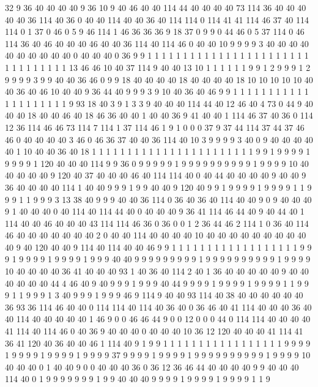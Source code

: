 32 9 36 40 40 40 40 9 36 10 9 40 46 40 40 114 44 40 40 40
40 73 114 36 40 40 40 40 40 36 114 40 36 0 40 40 114 40 40 36
40 114 114 0 114 41 41 114 46 37 40 114 114 0 1 37 0 46 0 5
9 46 114 1 46 36 36 36 9 18 37 0 9 9 0 44 46 0 5 37
114 0 46 114 36 40 46 40 40 40 46 40 40 36 114 40 114 46 0 40
40 10 9 9 9 9 3 40 40 40 40 40 40 40 40 40 40 0 40 40
40 0 36 9 9 1 1 1 1 1 1 1 1 1 1 1 1 1 1 1
1 1 1 1 1 1 1 1 1 1 1 1 1 1 1 1 1 13 46 46
10 40 37 114 9 40 40 13 10 1 1 1 1 1 1 9 9 1 2 9
9 9 1 2 9 9 9 9 3 9 9 40 40 36 46 0 9 9 18 40
40 40 40 18 40 40 40 40 18 10 10 10 10 10 40 40 36 40 46 10
40 40 9 36 44 40 9 9 9 3 9 10 40 36 40 46 9 9 1 1
1 1 1 1 1 1 1 1 1 1 1 1 1 1 1 1 1 1 9 93
18 40 3 9 1 3 3 9 40 40 40 114 44 40 12 46 40 4 73 0
44 9 40 40 40 18 40 40 46 40 18 46 36 40 40 1 40 40 36 9
41 40 40 1 114 46 37 40 36 0 114 12 36 114 46 46 73 114 7 114
1 37 114 46 1 9 1 0 0 0 37 9 37 44 114 37 44 37 46 46
0 40 40 40 40 3 46 0 46 36 37 40 40 36 114 40 10 3 9 9
9 9 3 40 0 9 40 40 40 40 40 1 10 40 40 36 40 18 1 1
1 1 1 1 1 1 1 1 1 1 1 1 1 1 1 1 1 1 1 1
1 9 9 1 9 9 9 9 1 9 9 9 9 1 120 40 40 40 114 9
9 36 0 9 9 9 9 9 1 9 9 9 9 9 9 9 9 9 9 1
9 9 9 9 10 40 40 40 40 40 9 120 40 37 40 40 40 46 40 114
114 40 0 40 44 40 40 40 40 9 40 40 9 36 40 40 40 40 114 1
40 40 9 9 9 1 9 9 40 40 9 120 40 9 9 1 9 9 9 9
1 9 9 9 9 1 1 9 9 9 1 1 9 9 9 3 13 38 40 9
9 9 40 40 36 114 0 36 40 36 40 114 40 40 9 0 9 40 40 40
9 1 40 40 40 0 40 114 40 114 44 40 0 40 40 40 9 36 41 114
46 44 40 9 40 44 40 1 114 40 40 46 40 40 40 43 114 114 46 36
0 36 0 0 1 2 36 44 46 2 114 1 0 36 40 114 46 40 40 40
40 40 40 40 2 0 40 40 114 40 40 40 40 10 40 40 40 40 40 40
40 40 40 40 9 40 120 40 40 9 114 40 114 40 40 46 9 9 1 1
1 1 1 1 1 1 1 1 1 1 1 1 1 1 1 1 9 9 9 1
9 9 9 9 1 9 9 9 9 1 9 9 9 40 40 9 9 9 9 9
9 9 9 9 1 9 9 9 9 9 9 9 9 9 9 1 9 9 9 9
10 40 40 40 40 36 41 40 40 40 93 1 40 36 40 114 2 40 1 36
40 40 40 40 40 9 40 40 40 40 40 40 44 4 46 40 9 40 9 9
9 1 9 9 9 40 44 9 9 9 9 1 9 9 9 9 1 9 9 9
9 1 1 9 9 9 1 1 9 9 9 1 3 40 9 9 9 1 9 9
9 46 9 114 9 40 40 93 114 40 38 40 40 40 40 40 40 36 93 36
114 46 40 40 0 114 114 40 114 40 36 40 0 36 46 40 41 114 40 40
40 36 40 40 114 40 40 40 40 40 1 46 9 0 0 46 46 44 9 0
0 12 0 0 0 44 0 114 114 40 40 40 40 41 114 40 114 46 0 40
36 9 40 40 40 0 40 40 40 10 36 12 120 40 40 40 41 114 41 36
41 120 40 36 40 40 46 1 114 40 9 1 9 9 1 1 1 1 1 1
1 1 1 1 1 1 1 1 1 1 1 9 9 9 9 1 9 9 9 9
1 9 9 9 9 1 9 9 9 9 37 9 9 9 9 1 9 9 9 9
1 9 9 9 9 9 9 9 9 9 9 1 9 9 9 9 10 40 40 40
0 1 40 40 9 0 0 40 40 40 36 0 36 12 36 46 44 40 40 40
40 9 9 40 40 40 114 40 0 1 9 9 9 9 9 9 9 1 9 9
40 40 40 9 9 9 9 1 9 9 9 9 1 9 9 9 9 1 1 9
